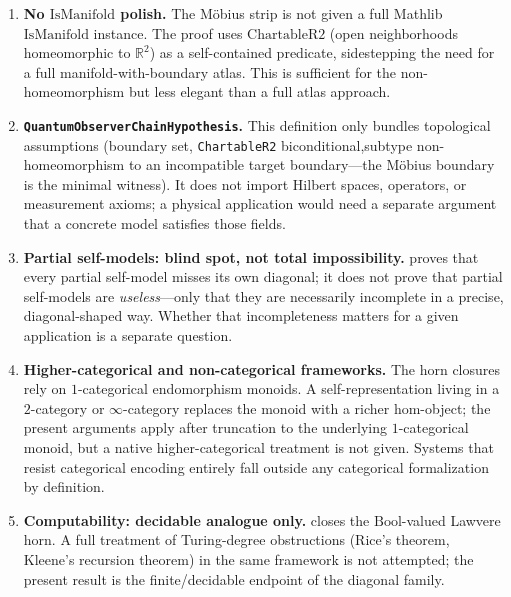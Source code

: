 \documentclass[11pt]{article}
\begin{document}
\begin{enumerate}
\item \textbf{No $\mathrm{IsManifold}$ polish.} The M\"obius strip is not given a full Mathlib $\mathrm{IsManifold}$ instance. The proof uses $\mathrm{ChartableR2}$ (open neighborhoods homeomorphic to $\mathbb{R}^2$) as a self-contained predicate, sidestepping the need for a full manifold-with-boundary atlas. This is sufficient for the non-homeomorphism but less elegant than a full atlas approach.

\item \textbf{\texttt{QuantumObserverChainHypothesis}.} This definition only
  bundles topological assumptions (boundary set, \texttt{ChartableR2}
  biconditional,\newline subtype non-homeomorphism to an incompatible target
  boundary---the M\"obius boundary is the minimal witness).  It does not
  import Hilbert spaces, operators, or measurement axioms; a physical
  application would need a separate argument that a concrete model satisfies
  those fields.

\item \textbf{Partial self-models: blind spot, not total impossibility.}
   proves that every partial
  self-model misses its own diagonal; it does not prove that partial
  self-models are \emph{useless}---only that they are necessarily incomplete
  in a precise, diagonal-shaped way.  Whether that incompleteness matters
  for a given application is a separate question.

\item \textbf{Higher-categorical and non-categorical frameworks.}
  The horn closures rely on $1$-categorical endomorphism monoids.  A
  self-representation living in a $2$-category or $\infty$-category
  replaces the monoid with a richer hom-object; the present arguments
  apply after truncation to the underlying $1$-categorical monoid, but
  a native higher-categorical treatment is not given.  Systems that
  resist categorical encoding entirely fall outside any categorical
  formalization by definition.

\item \textbf{Computability: decidable analogue only.}
   closes the
  $\mathrm{Bool}$-valued Lawvere horn.  A full treatment of Turing-degree
  obstructions (Rice's theorem, Kleene's recursion theorem) in the same
  framework is not attempted; the present result is the finite/decidable
  endpoint of the diagonal family.


\end{enumerate}
\end{document}
